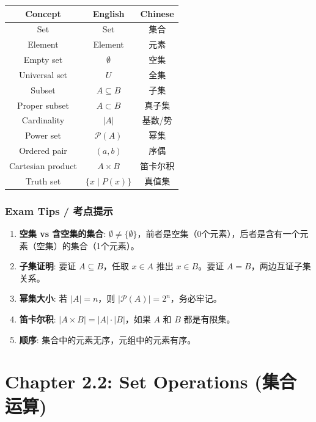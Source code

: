 \documentclass[10pt,a4paper,openany]{ctexbook}
\theoremstyle{definition}
\theoremstyle{remark}
\begin{document}
\begin{center}
\begin{tabular}{ccc}
\hline
Concept & English & Chinese \\ \hline
Set & Set & 集合 \\
Element & Element & 元素 \\
Empty set & $\emptyset$ & 空集 \\
Universal set & $U$ & 全集 \\
Subset & $A \subseteq B$ & 子集 \\
Proper subset & $A \subset B$ & 真子集 \\
Cardinality & $|A|$ & 基数/势 \\
Power set & $\mathcal{P}(A)$ & 幂集 \\
Ordered pair & $(a,b)$ & 序偶 \\
Cartesian product & $A \times B$ & 笛卡尔积 \\
Truth set & $\{x \mid P(x)\}$ & 真值集 \\
\hline
\end{tabular}

\end{center}

\subsubsection{Exam Tips / 考点提示}

\begin{enumerate}
\item \textbf{空集 vs 含空集的集合}: $\emptyset \neq \{\emptyset\}$，前者是空集（0个元素），后者是含有一个元素（空集）的集合（1个元素）。
\item \textbf{子集证明}: 要证 $A \subseteq B$，任取 $x \in A$ 推出 $x \in B$。要证 $A = B$，两边互证子集关系。
\item \textbf{幂集大小}: 若 $|A| = n$，则 $|\mathcal{P}(A)| = 2^n$，务必牢记。
\item \textbf{笛卡尔积}: $|A \times B| = |A| \cdot |B|$，如果 $A$ 和 $B$ 都是有限集。
\item \textbf{顺序}: 集合中的元素无序，元组中的元素有序。

\end{enumerate}

\newpage

\section{Chapter 2.2: Set Operations (集合运算)}
\end{document}

